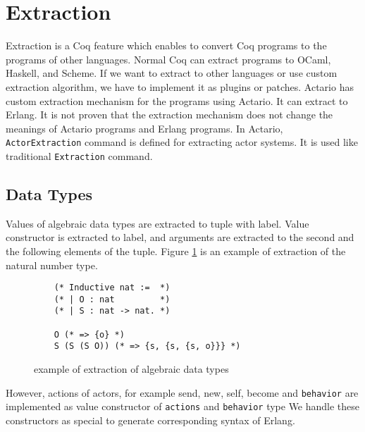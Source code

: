 \section{Extraction}
Extraction is a Coq feature which enables to convert Coq programs to the programs of other languages.
Normal Coq can extract programs to OCaml, Haskell, and Scheme.
If we want to extract to other languages or use custom extraction algorithm, we have to implement it as plugins or patches.
Actario has custom extraction mechanism for the programs using Actario.
It can extract to Erlang.
It is not proven that the extraction mechanism does not change the meanings of Actario programs and Erlang programs.
In Actario, \lstinline|ActorExtraction| command is defined for extracting actor systems.
It is used like traditional \lstinline|Extraction| command.

\subsection{Data Types}

Values of algebraic data types are extracted to tuple with label.
Value constructor is extracted to label, and arguments are extracted to the second and the following elements of the tuple.
Figure \ref{coq:adt} is an example of extraction of the natural number type.

\begin{figure}[t]
  \begin{lstlisting}
    (* Inductive nat :=  *)
    (* | O : nat         *)
    (* | S : nat -> nat. *)

    O (* => {o} *)
    S (S (S O)) (* => {s, {s, {s, o}}} *)
  \end{lstlisting}
  \caption{example of extraction of algebraic data types}\label{coq:adt}
\end{figure}

However, actions of actors, for example \textsf{send}, \textsf{new}, \textsf{self}, \textsf{become} and \texttt{behavior} are implemented as value constructor of \texttt{actions} and \texttt{behavior} type
We handle these constructors as special to generate corresponding syntax of Erlang.


